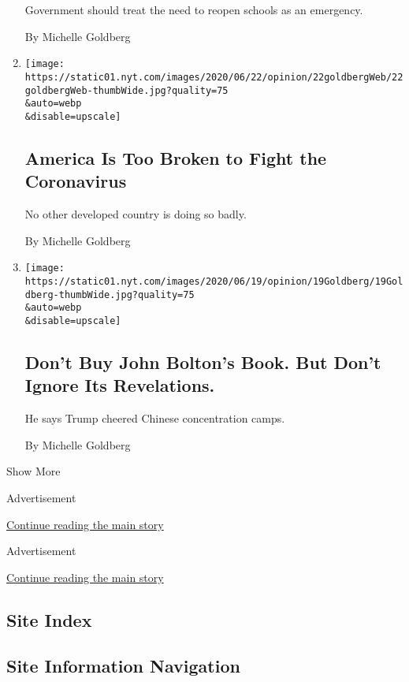 \begin{enumerate}
  Government should treat the need to reopen schools as an emergency.

  By Michelle Goldberg
\item
  \href{/2020/06/22/opinion/us-coronavirus-trump.html}{}

  \texttt{[image: https://static01.nyt.com/images/2020/06/22/opinion/22goldbergWeb/22goldbergWeb-thumbWide.jpg?quality=75\\\&auto=webp\\\&disable=upscale]}

  \hypertarget{america-is-too-broken-to-fight-the-coronavirus}{%
  \subsection{America Is Too Broken to Fight the
  Coronavirus}\label{america-is-too-broken-to-fight-the-coronavirus}}

  No other developed country is doing so badly.

  By Michelle Goldberg
\item
  \href{/2020/06/19/opinion/trump-john-bolton-book.html}{}

  \texttt{[image: https://static01.nyt.com/images/2020/06/19/opinion/19Goldberg/19Goldberg-thumbWide.jpg?quality=75\\\&auto=webp\\\&disable=upscale]}

  \hypertarget{dont-buy-john-boltons-book-but-dont-ignore-its-revelations}{%
  \subsection{Don't Buy John Bolton's Book. But Don't Ignore Its
  Revelations.}\label{dont-buy-john-boltons-book-but-dont-ignore-its-revelations}}

  He says Trump cheered Chinese concentration camps.

  By Michelle Goldberg
\end{enumerate}

Show More

Advertisement

\protect\hyperlink{after-mid1}{Continue reading the main story}

Advertisement

\protect\hyperlink{after-mktg}{Continue reading the main story}

\hypertarget{site-index}{%
\subsection{Site Index}\label{site-index}}

\hypertarget{site-information-navigation}{%
\subsection{Site Information
Navigation}\label{site-information-navigation}}

